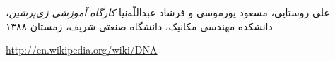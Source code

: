 \begin{thebibliography}{99} %
\Persian
{}
علی روستایی، مسعود پورموسی و فرشاد عبداللّه‌نیا \emph{کارگاه آموزشی زی‌پرشین}، دانشکده مهندسی مکانیک، دانشگاه صنعتی شریف، زمستان ۱۳۸۸

\Latin
{}
\url{http://en.wikipedia.org/wiki/DNA}

\end{thebibliography}
